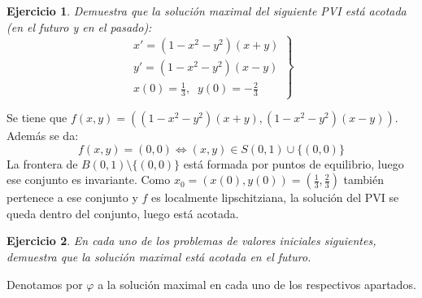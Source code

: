 \documentclass[12pt]{article}
\newtheorem{ejercicio}{Ejercicio}
\theoremstyle{definition}
\theoremstyle{remark}
\begin{document}
\begin{ejercicio}
Demuestra que la solución maximal del siguiente PVI está acotada (en el futuro y en el pasado):
\[
\left.
\begin{array}{c}
x'=(1-x^2-y^2)(x+y)\\
y'=(1-x^2-y^2)(x-y)\\
x(0)=\frac{1}{3}, \;\; y(0)=-\frac{2}{3}
\end{array}
\right\}
\]
\end{ejercicio}

Se tiene que $f(x,y)=\left((1-x^2-y^2)(x+y), (1-x^2-y^2)(x-y)\right)$. Además se da:
\[
f(x,y)=(0,0) \Leftrightarrow (x,y) \in S(0,1)\cup\{(0,0)\}
\]
La frontera de $B(0,1)\setminus\{(0,0)\}$ está formada por puntos de equilibrio, luego ese conjunto es invariante. Como $x_0=(x(0),y(0))=(\frac{1}{3},\frac{2}{3})$ también pertenece a ese conjunto y $f$ es localmente lipschitziana, la solución del PVI se queda dentro del conjunto, luego está acotada. 

\begin{ejercicio}
En cada uno de los problemas de valores iniciales siguientes, demuestra que la solución maximal está acotada en el futuro.
\end{ejercicio}

Denotamos por $\varphi$ a la solución maximal en cada uno de los respectivos apartados.
\end{document}
